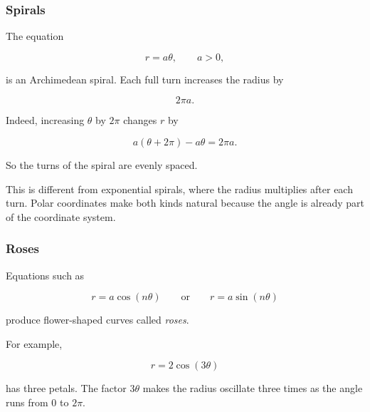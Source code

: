 \subsubsection*{Spirals}

The equation

\[
r=a\theta,
\qquad
a>0,
\]

is an Archimedean spiral.  Each full turn increases the radius by

\[
2\pi a.
\]

Indeed, increasing \(\theta\) by \(2\pi\) changes \(r\) by

\[
a(\theta+2\pi)-a\theta=2\pi a.
\]

So the turns of the spiral are evenly spaced.

This is different from exponential spirals, where the radius multiplies after each turn.
Polar coordinates make both kinds natural because the angle is already part of the
coordinate system.

\subsubsection*{Roses}

Equations such as

\[
r=a\cos(n\theta)
\qquad\text{or}\qquad
r=a\sin(n\theta)
\]

produce flower-shaped curves called \emph{roses}.

For example,

\[
r=2\cos(3\theta)
\]

has three petals.  The factor \(3\theta\) makes the radius oscillate three times as the
angle runs from \(0\) to \(2\pi\).


